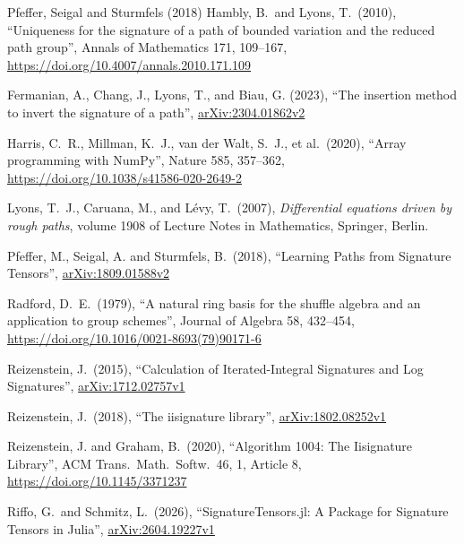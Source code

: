\documentclass[11pt,english]{article}
\theoremstyle{definition}
\theoremstyle{remark}
\begin{document}
\begin{thebibliography}{Pfeffer, Seigal and Sturmfels (2018)}
Hambly, B.\ and Lyons,
T.\ (2010), ``Uniqueness for the signature of a path of bounded
variation and the reduced path group'', Annals of Mathematics 171,
109--167,
\href{https://doi.org/10.4007/annals.2010.171.109}{https://doi.org/10.4007/annals.2010.171.109}

Fermanian, A., Chang, J.,
Lyons, T., and Biau, G. (2023), ``The insertion method to invert the
signature of a path'', \href{https://arxiv.org/abs/2304.01862v2}{arXiv:2304.01862v2}

Harris, C.~R., Millman, K.~J.,
van der Walt, S.~J., et al.\ (2020), ``Array programming with NumPy'',
Nature 585, 357--362,
\href{https://doi.org/10.1038/s41586-020-2649-2}{https://doi.org/10.1038/s41586-020-2649-2}

Lyons, T.~J., Caruana, M.,
and Lévy, T.\ (2007), \emph{Differential equations driven by rough paths},
volume 1908 of Lecture Notes in Mathematics, Springer, Berlin.

Pfeffer, M.,
Seigal, A. and Sturmfels, B.\ (2018), ``Learning Paths from Signature
Tensors'', \href{https://arxiv.org/abs/1809.01588v2}{arXiv:1809.01588v2}

Radford, D.~E.\ (1979), ``A natural
ring basis for the shuffle algebra and an application to group
schemes'', Journal of Algebra 58, 432--454,
\href{https://doi.org/10.1016/0021-8693(79)90171-6}{https://doi.org/10.1016/0021-8693(79)90171-6}

Reizenstein, J.\ (2015),
``Calculation of Iterated-Integral Signatures and Log Signatures'',
\href{https://arxiv.org/abs/1712.02757v1}{arXiv:1712.02757v1}

Reizenstein, J.\ (2018),
``The iisignature library'',
\href{https://arxiv.org/abs/1802.08252v1}{arXiv:1802.08252v1}

Reizenstein, J.
and Graham, B.\ (2020), ``Algorithm 1004: The Iisignature Library'',
ACM Trans.\ Math.\ Softw.\ 46, 1, Article 8,
\href{https://doi.org/10.1145/3371237}{https://doi.org/10.1145/3371237}

Riffo, G.\ and
Schmitz, L.\ (2026), ``SignatureTensors.jl: A Package for Signature
Tensors in Julia'',
\href{https://arxiv.org/abs/2604.19227v1}{arXiv:2604.19227v1}


\end{thebibliography}
\end{document}
